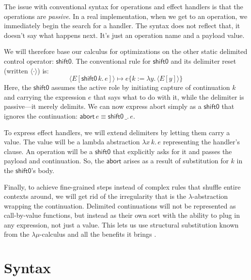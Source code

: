 \documentclass[a4paper, 11pt,titlepage, openright, twoside]{report}
\newcommand{\shiftz}{\textsf{shift0}}
\newcommand{\abort}{\textsf{abort}}
\newcommand{\subst}[2]{\{#1{:=}#2\}}
\newcommand{\+}{\enspace}
\begin{document}
The issue with conventional syntax for operations and effect handlers is that
the operations are \textit{passive}.
In a real implementation, when we get to an operation, we immediately begin the search for a handler.
The syntax does not reflect that, it doesn't say what happens next. It's just an operation name and a payload value.

We will therefore base our calculus for optimizations on the other static delimited control operator:
$\shiftz$. The conventional rule for $\shiftz$ and its delimiter \textsf{reset} (written $⟨·⟩$) \cite{subtyping} is:
$$⟨E[\shiftz\,k.\,e]⟩ ↦ e\subst{k}{λy.\,⟨E[y]⟩}$$
Here, the $\shiftz$ assumes the active role by initiating capture of continuation $k$ and carrying the expression $e$ that says what to do with it,
while the delimiter is passive---it merely delimits.
We can now express \abort{} simply as a $\shiftz$ that ignores the continuation: $\textsf{abort}\,e ≡ \shiftz\,\_.\,e$.

To express effect handlers, we will extend delimiters by letting them carry a value.
The value will be a lambda abstraction $λx\,k.\,e$ representing the handler's clause.
An operation will be a $\shiftz$ that explicitly asks for it and passes the payload and continuation.
So, the $\abort$ arises as a result of substitution for $k$ in the $\shiftz$'s body.

Finally, to achieve fine-grained steps instead of complex rules that shuffle entire contexts around,
we will get rid of the irregularity that is the $λ$-abstraction wrapping the continuation.
Delimited continuations will not be represented as call-by-value functions, but instead
as their own sort with the ability to plug in any expression, not just a value.
This lets us use structural substitution known from the $λμ$-calculus and all the benefits it brings \cite{benefit}.

\chapter{Syntax}
\label{Syntax}
\end{document}
